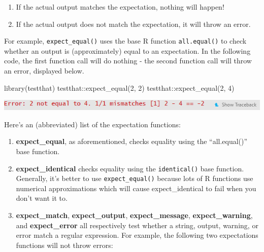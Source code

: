 \documentclass[
]{book}
\newenvironment{Shaded}{\begin{snugshade}}{\end{snugshade}}
\newcommand{\DecValTok}[1]{\textcolor[rgb]{0.00,0.00,0.81}{#1}}
\newcommand{\FunctionTok}[1]{\textcolor[rgb]{0.00,0.00,0.00}{#1}}
\newcommand{\NormalTok}[1]{#1}
\newcommand{\SpecialCharTok}[1]{\textcolor[rgb]{0.00,0.00,0.00}{#1}}
\providecommand{\tightlist}{%
  \setlength{\itemsep}{0pt}\setlength{\parskip}{0pt}}
\begin{document}
\begin{enumerate}
\def\labelenumi{\arabic{enumi}.}
\tightlist
\item
  If the actual output matches the expectation, nothing will happen!
\item
  If the actual output does not match the expectation, it will throw an error.
\end{enumerate}

For example, \texttt{expect\_equal()} uses the base R function \texttt{all.equal()} to check whether an output is (approximately) equal to an expectation. In the following code, the first function call will do nothing - the second function call will throw an error, displayed below.

\begin{Shaded}
\begin{Highlighting}[]
\FunctionTok{library}\NormalTok{(testthat)}
\NormalTok{testthat}\SpecialCharTok{::}\FunctionTok{expect\_equal}\NormalTok{(}\DecValTok{2}\NormalTok{, }\DecValTok{2}\NormalTok{)}
\NormalTok{testthat}\SpecialCharTok{::}\FunctionTok{expect\_equal}\NormalTok{(}\DecValTok{2}\NormalTok{, }\DecValTok{4}\NormalTok{)}
\end{Highlighting}
\end{Shaded}

\includegraphics{images/testSS/expectationerror.PNG}

Here's an (abbreviated) list of the expectation functions:

\begin{enumerate}
\def\labelenumi{\arabic{enumi}.}
\tightlist
\item
  \textbf{expect\_equal}, as aforementioned, checks equality using the ``all.equal()'' base function.
\item
  \textbf{expect\_identical} checks equality using the \texttt{identical()} base function. Generally, it's better to use \texttt{expect\_equal()} because lots of R functions use numerical approximations which will cause expect\_identical to fail when you don't want it to.
\item
  \textbf{expect\_match}, \textbf{expect\_output}, \textbf{expect\_message}, \textbf{expect\_warning}, and \textbf{expect\_error} all respectively test whether a string, output, warning, or error match a regular expression. For example, the following two expectations functions will not throw errors:
\end{enumerate}
\end{document}
